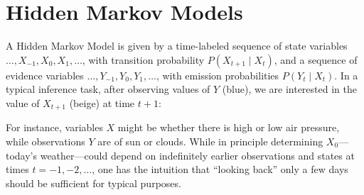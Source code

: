 \documentclass[10pt,letterpaper]{article}
\newcommand{\red}[1]{\textcolor{Red}{#1}}
\begin{document}
\section{Hidden Markov Models}

A Hidden Markov Model is given by a time-labeled sequence of state variables $\dots,X_{-1},X_{0},X_1,\dots$, %
with transition probability $P(X_{t+1}\mid X_t)$, and a sequence of evidence variables $\dots,Y_{-1},Y_0,Y_1,\dots$, with emission probabilities $P(Y_t\mid X_t)$. In a typical inference task, after observing  values of $Y$ (blue), we are interested in the value of $X_{t+1}$ (beige) at time $t+1$:

\begin{figure}[h] 
\begin{center}
\end{center} 
\end{figure} 
\noindent For instance, variables $X$ might be whether there is high or low air pressure, while observations $Y$ are of sun or clouds. While in principle determining $X_{0}$---today's weather---could depend on indefinitely earlier observations and states at times $t=-1,-2,\dots$, one has the intuition that ``looking back'' only a few days should be sufficient for typical purposes.
\end{document}
